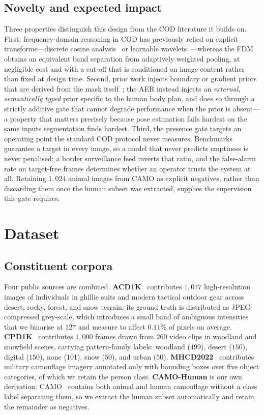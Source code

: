 \documentclass[3p,times,procedia]{elsarticle}
\begin{document}
\subsection{Novelty and expected impact}

Three properties distinguish this design from the COD literature it builds on. First, frequency-domain reasoning in COD has previously relied on explicit transforms---discrete cosine analysis~\cite{fdnet} or learnable wavelets~\cite{feder}---whereas the FDM obtains an equivalent band separation from adaptively weighted pooling, at negligible cost and with a cut-off that is conditioned on image content rather than fixed at design time. Second, prior work injects boundary or gradient priors that are derived from the mask itself~\cite{bgnet,dgnet,feder}; the AER instead injects an \emph{external, semantically typed} prior specific to the human body plan, and does so through a strictly additive gate that cannot degrade performance when the prior is absent---a property that matters precisely because pose estimation fails hardest on the same inputs segmentation finds hardest. Third, the presence gate targets an operating point the standard COD protocol never measures. Benchmarks guarantee a target in every image, so a model that never predicts emptiness is never penalised; a border surveillance feed inverts that ratio, and the false-alarm rate on target-free frames determines whether an operator trusts the system at all. Retaining $1{,}024$ animal images from CAMO as explicit negatives, rather than discarding them once the human subset was extracted, supplies the supervision this gate requires.

\section{Dataset}
\label{sec:dataset}

\subsection{Constituent corpora}

Four public sources are combined. \textbf{ACD1K}~\cite{acd1k} contributes $1{,}077$ high-resolution images of individuals in ghillie suits and modern tactical outdoor gear across desert, rocky, forest, and snow terrain; its ground truth is distributed as JPEG-compressed grey-scale, which introduces a small band of ambiguous intensities that we binarise at $127$ and measure to affect $0.11\%$ of pixels on average. \textbf{CPD1K}~\cite{ddcn} contributes $1{,}000$ frames drawn from $260$ video clips in woodland and snowfield scenes, carrying pattern-family labels: woodland ($499$), desert ($150$), digital ($150$), none ($101$), snow ($50$), and urban ($50$). \textbf{MHCD2022}~\cite{mhnet} contributes military camouflage imagery annotated only with bounding boxes over five object categories, of which we retain the person class. \textbf{CAMO-Human} is our own derivation: CAMO~\cite{camo} contains both animal and human camouflage without a class label separating them, so we extract the human subset automatically and retain the remainder as negatives.
\end{document}
